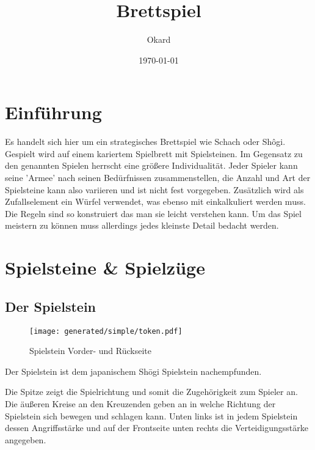 \documentclass{article}
\title{Brettspiel}
\author{Okard}
\date{\today}
\begin{document}
\maketitle
\tableofcontents
\newpage

\section{Einführung}
	Es handelt sich hier um ein strategisches Brettspiel wie Schach oder Shôgi.
	Gespielt wird auf einem kariertem Spielbrett mit Spielsteinen.
	Im Gegensatz zu den genannten Spielen herrscht eine größere Individualität.
	Jeder Spieler kann seine 'Armee' nach seinen Bedürfnissen zusammenstellen, die
	Anzahl und Art der Spielsteine kann also variieren und ist nicht fest vorgegeben.
	Zusätzlich wird als Zufallselement ein Würfel verwendet, was ebenso mit einkalkuliert 
	werden muss.
	Die Regeln sind so konstruiert das man sie leicht verstehen kann. Um das Spiel meistern
	zu können muss allerdings jedes kleinste Detail bedacht werden.
	
	
	


\section{Spielsteine \& Spielzüge}

\subsection{Der Spielstein}
		
	\begin{wrapfigure}{l}{5cm}
	\centering
	\texttt{[image: generated/simple/token.pdf]}
	\caption{Spielstein Vorder- und Rückseite}
	\end{wrapfigure}
	
	Der Spielstein ist dem japanischem Sh\=ogi Spielstein nachempfunden. 
	
	Die Spitze zeigt die Spielrichtung und somit die Zugehörigkeit zum Spieler an.
	Die äußeren Kreise an den Kreuzenden geben an in welche Richtung der Spielstein sich bewegen und schlagen kann.
	Unten links ist in jedem Spielstein dessen Angriffsstärke und auf der Frontseite unten rechts die Verteidigungsstärke angegeben.
	
\end{document}
